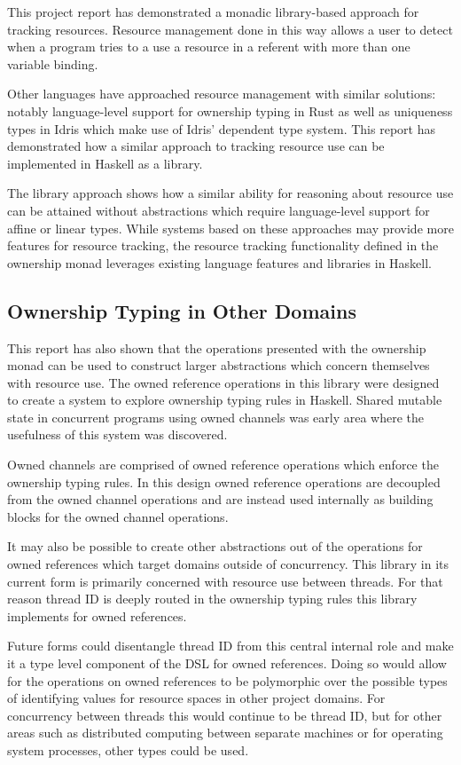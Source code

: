 \documentclass[onehalf,11pt]{beavtex}
\begin{document}
This project report has demonstrated a monadic library-based approach for
tracking resources.
Resource management done in this way allows a user to detect when a program
tries to a use a resource in a referent with more than one variable binding.

Other languages have approached resource management with similar solutions:
notably language-level support for ownership typing in Rust as well as
uniqueness types in Idris which make use of Idris' dependent type system.
This report has demonstrated how a similar approach to tracking resource use
can be implemented in Haskell as a library.

The library approach shows how a similar ability for reasoning about resource
use can be attained without abstractions which require language-level support
for affine or linear types.
While systems based on these approaches may provide more features for resource
tracking, the resource tracking functionality defined in the ownership
monad leverages existing language features and libraries in Haskell.

\subsection{Ownership Typing in Other Domains}

This report has also shown that the operations presented with the ownership
monad can be used to construct larger abstractions which concern themselves with
resource use. The owned reference operations in this library were designed to
create a system to explore ownership typing rules in Haskell.  Shared mutable
state in concurrent programs using owned channels was early area where the
usefulness of this system was discovered.

Owned channels are comprised of owned reference operations which enforce the
ownership typing rules.
In this design owned reference operations are decoupled from the owned channel
operations and are instead used internally as building blocks for the owned
channel operations. 

It may also be possible to create other abstractions out of the operations
for owned references which target domains outside of concurrency.
This library in its current form is primarily concerned with resource use
between threads.
For that reason thread ID is deeply routed in the ownership typing rules this
library implements for owned references.

Future forms could disentangle thread ID from this central internal role
and make it a type level component of the DSL for owned references.
Doing so would allow for the operations on owned references to be polymorphic
over the possible types of identifying values for resource spaces in other
project domains. For concurrency between threads this would continue to be
thread ID, but for other areas such as distributed computing between separate
machines or for operating system processes, other types could be used.



{}

\end{document}

